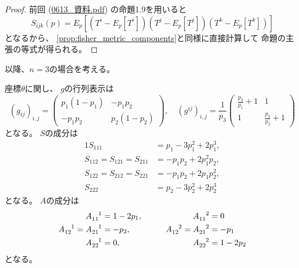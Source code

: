 \documentclass[report]{jlreq}
\begin{document}
\begin{proof}
    前回 (\url{0613_資料.pdf}) の命題1.9を用いると
    \begin{equation}
        S_{ijk}(p)
            = E_p [
                (T^i - E_p[T^i])
                (T^j - E_p[T^j])
                (T^k - E_p[T^k])
            ]
    \end{equation}
    となるから、
    \cref{prop:fisher_metric_components}と同様に直接計算して
    命題の主張の等式が得られる。
\end{proof}

以降、$n = 3$の場合を考える。

\begin{proposition}[$n = 3$での$g, S, A$の計算]
    座標$\theta$に関し、
    $g$の行列表示は
    \begin{equation}
        (g_{ij})_{i, j}
            = \begin{pmatrix}
                p_1 (1 - p_1) & - p_1 p_2 \\
                - p_1 p_2 & p_2 (1 - p_2)
            \end{pmatrix},
            \quad
        (g^{ij})_{i, j}
            = \frac{1}{p_3}
                \begin{pmatrix}
                    \frac{p_3}{p_1} + 1 & 1 \\
                    1 & \frac{p_3}{p_2} + 1
                \end{pmatrix}
    \end{equation}
    となる。
    $S$の成分は
    \begin{alignat}{1}
        S_{111}
            &= p_1 - 3 p_1^2 + 2 p_1^3, \\
        S_{112} = S_{121} = S_{211}
            &= - p_1 p_2 + 2 p_1^2 p_2, \\
        S_{122} = S_{212} = S_{221}
            &= - p_1 p_2 + 2 p_1 p_2^2, \\
        S_{222}
            &= p_2 - 3 p_2^2 + 2 p_2^3
    \end{alignat}
    となる。
    $A$の成分は
    \begin{alignat}{2}
        A_{11}^{\hphantom{11}1}
            &=
                1 - 2p_1,
                \qquad
        &A_{11}^{\hphantom{11}2}
            &=
                0
                \\
        A_{12}^{\hphantom{12}1}
            =
                A_{21}^{\hphantom{21}1}
            &=
                - p_2,
                \qquad
        &A_{12}^{\hphantom{12}2}
            =
                A_{21}^{\hphantom{21}2}
            &=
                - p_1
                \\
        A_{22}^{\hphantom{22}1}
            &=
                0,
                \qquad
        &A_{22}^{\hphantom{22}2}
            &=
                1 - 2p_2
    \end{alignat}
    となる。
\end{proposition}
\end{document}
